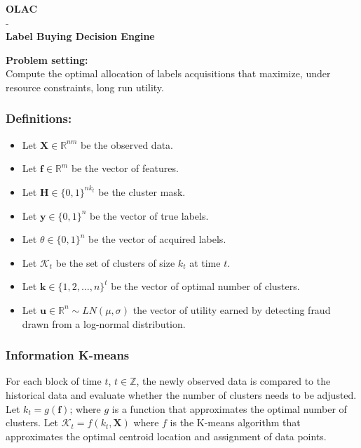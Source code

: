 \documentclass[paper=a4, fontsize=12pt]{scrartcl}
\begin{document}
\begin{center}
\Large{\textbf{OLAC}\\
- \\
\textbf{Label Buying Decision Engine}}\\[5mm]
\normalsize
\end{center}
\textbf{Problem setting:}\\
Compute the optimal allocation of labels acquisitions that maximize, under resource constraints, long run utility.\\

\subsubsection*{Definitions:}
\begin{itemize}
\item Let $\mathbf{X} \in \mathbb{R}^{nm}$ be the observed data.
\item Let $\textbf{f} \in \mathbb{R}^{m}$ be the vector of features.
\item Let $\textbf{H} \in {\{0,1\}}^{nk_{t}}$ be the cluster mask.
\item Let $\textbf{y} \in {\{0,1\}}^n$ be the vector of true labels.
\item Let $\theta \in {\{0,1\}}^n$ be the vector of acquired labels.
\item Let $\mathcal{K}_{t}$ be the set of clusters of size $k_{t}$ at time $t$.
\item Let $\textbf{k} \in {\{1,2,\ldots,n\}}^{t}$ be the vector of optimal number of clusters.
\item Let $\textbf{u} \in \mathbb{R}^{n}\sim LN(\mu, \sigma)$ the vector of utility earned by detecting fraud drawn from a log-normal distribution.
\end{itemize}
\subsubsection*{Information K-means}
For each block of time $t$, $t \in \mathbb{Z}$, the newly observed data is compared to the historical data and evaluate whether the number of clusters needs to be adjusted.\\
Let $k_{t} = g(\textbf{f})$; where $g$ is a function that approximates the optimal number of clusters.
Let $\mathcal{K}_{t} = f(k_{t}, \textbf{X})$ where $f$ is the K-means algorithm that approximates the optimal centroid location and assignment of data points.\\
\end{document}
